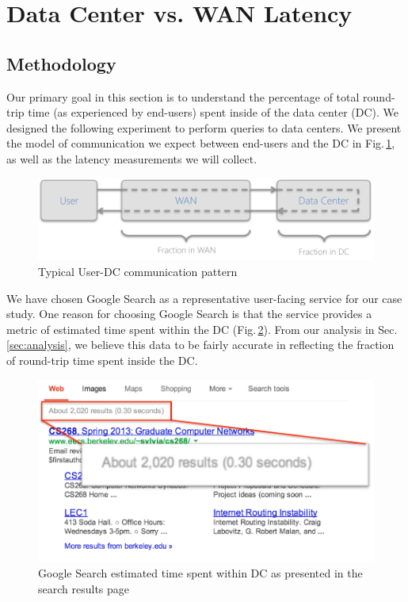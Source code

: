 \section{Data Center vs. WAN Latency}

\subsection{Methodology}
Our primary goal in this section is to understand the percentage of total round-trip time (as experienced by end-users) spent inside of the data center (DC). We designed the following experiment to perform queries to data centers. We present the model of communication we expect between end-users and the DC in Fig.\,\ref{fig:DC_model}, as well as the latency measurements we will collect. 

\begin{figure}
  \centering
  \includegraphics[width=\linewidth]{../figs/DC_model.pdf}
  \caption{Typical User-DC communication pattern}
  \label{fig:DC_model}
\end{figure}

We have chosen Google Search as a representative user-facing service for our case study. One reason for choosing Google Search is that the service provides a metric of estimated time spent within the DC (Fig.\,\ref{fig:google_time}). From our analysis in Sec.\,\ref{sec:analysis}, we believe this data to be fairly accurate in reflecting the fraction of round-trip time spent inside the DC.

\begin{figure}[t]
  \centering
  \includegraphics[width=0.85\linewidth]{../figs/GoogleTime.pdf}
  \caption{Google Search estimated time spent within DC as presented in the search results page}
  \label{fig:google_time}
\end{figure}

